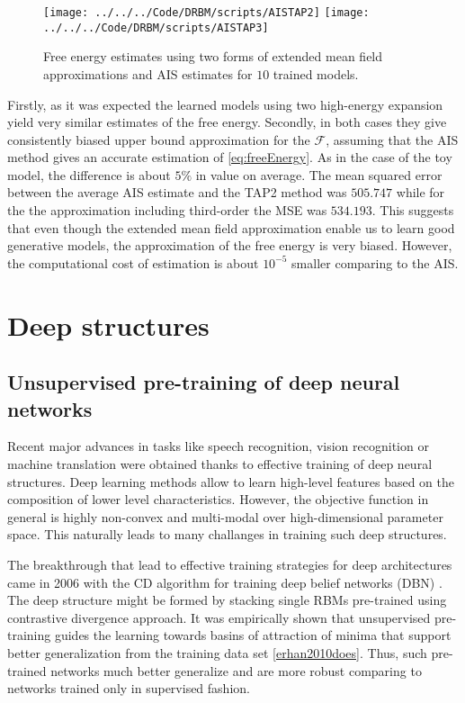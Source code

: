 \begin{figure}[!htb]
%
 \texttt{[image: ../../../Code/DRBM/scripts/AISTAP2]}
\endminipage 
{}  
 \texttt{[image: ../../../Code/DRBM/scripts/AISTAP3]}
\endminipage\hfill
  \caption[1]{Free energy estimates using two forms of extended mean field approximations and AIS estimates for $10$ trained models.}
  \label{fig:AISTAP2}
\end{figure}

Firstly, as it was expected the learned models using two high-energy expansion yield very similar estimates of the free energy. Secondly, in both cases they give consistently biased upper bound approximation for the $\mathcal{F}$, assuming that the AIS method gives an accurate estimation of \ref{eq:freeEnergy}. As in the case of the toy model, the difference is about $5 \%$ in value on average. The mean squared error between the average AIS estimate and the TAP2 method was $505.747$ while for the the approximation including third-order the MSE was $534.193$. This suggests that even though the extended mean field approximation enable us to learn good generative models, the approximation of the free energy is very biased. However, the computational cost of estimation is about $10^{-5}$ smaller comparing to the AIS.

\section{Deep structures}
\subsection{Unsupervised pre-training of deep neural networks}
Recent major advances in tasks like speech recognition, vision recognition or machine translation were obtained thanks to effective training of deep neural structures. Deep learning methods allow to learn high-level features based on the composition of lower level characteristics. However, the objective function in general is highly non-convex and multi-modal over high-dimensional parameter space. This naturally leads to many challanges in training such deep structures.
 
The breakthrough that lead to effective training strategies for deep architectures came in 2006 with the CD algorithm for training deep belief networks (DBN) \cite{hinton2006reducing}. The deep structure might be formed by stacking single RBMs pre-trained using contrastive divergence approach. It was empirically shown that unsupervised pre-training guides the learning towards basins of attraction of minima that support better generalization from the training data set \ref{erhan2010does}. Thus, such pre-trained networks much better generalize and are more robust comparing to networks trained only in supervised fashion.

